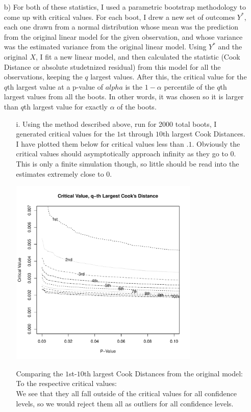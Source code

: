 \documentclass[11pt]{article}
\theoremstyle{definition}
\begin{document}
\begin{itemize}
\begin{itemize}
\begin{itemize}
                \end{itemize}
            \item[b)]
                For both of these statistics, I used a parametric bootstrap methodology to come up with critical values. For each boot, I drew a new set of outcomes $Y^*$, each one drawn from a normal distribution whose mean was the prediction from the original linear model for the given observation, and whose variance was the estimated variance from the original linear model. Using $Y^*$ and the original $X$, I fit a new linear model, and then calculated the statistic (Cook Distance or absolute studetnized residual) from this model for all the observations, keeping the $q$ largest values. After this, the critical value for the $q$th largest value at a p-value of $alpha$ is the $1-\alpha$ percentile of the $q$th largest values from all the boots. In other words, it was chosen so it is larger than $q$th largest value for exactly $\alpha$ of the boots. 
                \begin{itemize}
                    \item[i.]
                        Using the method described above, run for 2000 total boots, I generated critical values for the $1$st through $10$th largest Cook Distances. I have plotted them below for critical values less than $.1$. Obviously the critical values should asymptotically approach infinity as they go to $0$. This is only a finite simulation though, so little should be read into the estimates extremely close to $0$.
                        \begin{center}
                            \includegraphics[width=9cm]{final/2bi_plot} 
                        \end{center}
                        Comparing the $1$st-$10$th largest Cook Distances from the original model:\\ 
                         
                        To the respective critical values: \\
                         
                        We see that they all fall outside of the critical values for all confidence levels, so we would reject them all as outliers for all confidence levels.


\end{itemize}
\end{itemize}
\end{itemize}
\end{document}
